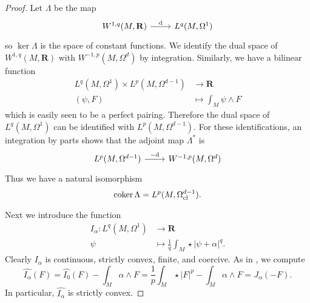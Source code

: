 \documentclass[reqno,11pt]{amsart}
\newcommand{\RR}{\mathbf{R}}
\DeclareMathOperator{\coker}{coker}
\theoremstyle{definition}
\numberwithin{equation}{section}
\begin{document}
\begin{proof}
Let $\Lambda$ be the map 
\[\begin{tikzcd}
	{W^{1, q}(M, \mathbf R)} & {L^q(M, \Omega^1)}
	\arrow["{\mathrm d}", from=1-1, to=1-2]
\end{tikzcd}\]
so $\ker \Lambda$ is the space of constant functions.
We identify the dual space of $W^{1, q}(M, \RR)$ with $W^{-1, p}(M, \Omega^d)$ by integration.
Similarly, we have a bilinear function
\begin{align*}
	L^q(M, \Omega^1) \times L^p(M, \Omega^{d - 1}) &\to \RR \\
	(\psi, F) &\mapsto \int_M \psi \wedge F
\end{align*}
which is easily seen to be a perfect pairing.
Therefore the dual space of $L^q(M, \Omega^1)$ can be identified with $L^p(M, \Omega^{d - 1})$.
For these identifications, an integration by parts shows that the adjoint map $\Lambda^*$ is
\[\begin{tikzcd}
	{L^p(M, \Omega^{d - 1})} & {W^{-1, p}(M, \Omega^d)}
	\arrow["{-\mathrm d}", from=1-1, to=1-2]
\end{tikzcd}\]
Thus we have a natural isomorphism
$$\coker \Lambda = L^p(M, \Omega^{d - 1}_{\rm cl}).$$

Next we introduce the function
\begin{align*}
I_\alpha: L^q(M, \Omega^1) &\to \RR \\
\psi &\mapsto \frac{1}{q} \int_M \star |\psi + \alpha|^q.
\end{align*}
Clearly $I_\alpha$ is continuous, strictly convex, finite, and coercive.
As in \cite[Chapter IV, \S2.2]{Ekeland99}, we compute 
$$\widehat{I_\alpha}(F) = \widehat{I_0}(F) - \int_M \alpha \wedge F = \frac{1}{p} \int_M \star |F|^p - \int_M \alpha \wedge F = J_\alpha(-F).$$
In particular, $\widehat{I_\alpha}$ is strictly convex.


\end{proof}
\end{document}
